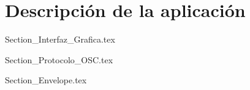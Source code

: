 \chapter{Descripción de la aplicación}

	{Section_Interfaz_Grafica.tex}
	
	{Section_Protocolo_OSC.tex}
	
	{Section_Envelope.tex}
